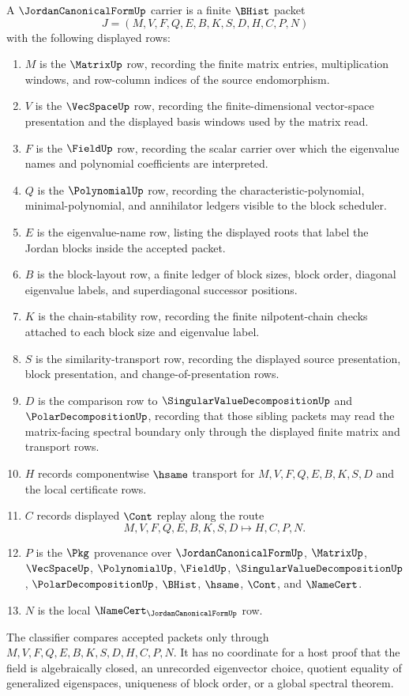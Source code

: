 \begin{definition}
\label{def:jordan-canonical-form-carrier}
A $\JordanCanonicalFormUp$ carrier is a finite $\BHist$ packet
$$
J=(M,V,F,Q,E,B,K,S,D,H,C,P,N)
$$
with the following displayed rows:
\begin{enumerate}
\item $M$ is the $\MatrixUp$ row, recording the finite matrix entries, multiplication windows, and row-column indices of the source endomorphism.
\item $V$ is the $\VecSpaceUp$ row, recording the finite-dimensional vector-space presentation and the displayed basis windows used by the matrix read.
\item $F$ is the $\FieldUp$ row, recording the scalar carrier over which the eigenvalue names and polynomial coefficients are interpreted.
\item $Q$ is the $\PolynomialUp$ row, recording the characteristic-polynomial, minimal-polynomial, and annihilator ledgers visible to the block scheduler.
\item $E$ is the eigenvalue-name row, listing the displayed roots that label the Jordan blocks inside the accepted packet.
\item $B$ is the block-layout row, a finite ledger of block sizes, block order, diagonal eigenvalue labels, and superdiagonal successor positions.
\item $K$ is the chain-stability row, recording the finite nilpotent-chain checks attached to each block size and eigenvalue label.
\item $S$ is the similarity-transport row, recording the displayed source presentation, block presentation, and change-of-presentation rows.
\item $D$ is the comparison row to $\SingularValueDecompositionUp$ and $\PolarDecompositionUp$, recording that those sibling packets may read the matrix-facing spectral boundary only through the displayed finite matrix and transport rows.
\item $H$ records componentwise $\hsame$ transport for $M,V,F,Q,E,B,K,S,D$ and the local certificate rows.
\item $C$ records displayed $\Cont$ replay along the route
$$
M,V,F,Q,E,B,K,S,D \longmapsto H,C,P,N .
$$
\item $P$ is the $\Pkg$ provenance over $\JordanCanonicalFormUp$, $\MatrixUp$, $\VecSpaceUp$, $\PolynomialUp$, $\FieldUp$, $\SingularValueDecompositionUp$, $\PolarDecompositionUp$, $\BHist$, $\hsame$, $\Cont$, and $\NameCert$.
\item $N$ is the local $\NameCert_{\JordanCanonicalFormUp}$ row.
\end{enumerate}
The classifier compares accepted packets only through $M,V,F,Q,E,B,K,S,D,H,C,P,N$. It has no coordinate for a host proof that the field is algebraically closed, an unrecorded eigenvector choice, quotient equality of generalized eigenspaces, uniqueness of block order, or a global spectral theorem.
\end{definition}

